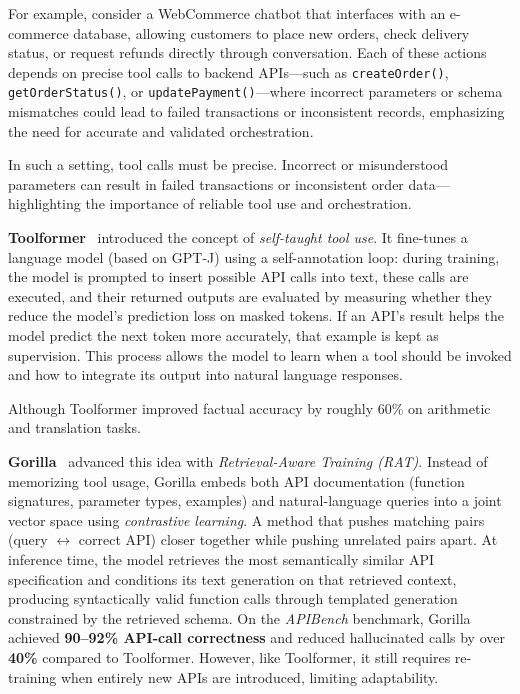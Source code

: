 For example, consider a WebCommerce chatbot that interfaces with an e-commerce database, allowing customers to place new orders, check delivery status, or request refunds directly through conversation.
Each of these actions depends on precise tool calls to backend APIs—such as \texttt{createOrder()}, \texttt{getOrderStatus()}, or \texttt{updatePayment()}—where incorrect parameters or schema mismatches could lead to failed transactions or inconsistent records, emphasizing the need for accurate and validated orchestration. 

In such a setting, tool calls must be precise. Incorrect or misunderstood parameters can result in failed transactions or inconsistent order data—highlighting the importance of reliable tool use and orchestration.

\textbf{Toolformer}~\cite{schick2023toolformer} introduced the concept of \emph{self-taught tool use}.  
It fine-tunes a language model (based on GPT-J) using a self-annotation loop: during training, the model is prompted to insert possible API calls into text, these calls are executed, and their returned outputs are evaluated by measuring whether they reduce the model’s prediction loss on masked tokens.  
If an API’s result helps the model predict the next token more accurately, that example is kept as supervision.  
This process allows the model to learn when a tool should be invoked and how to integrate its output into natural language responses.  

Although Toolformer improved factual accuracy by roughly 60\% on arithmetic and translation tasks.

\textbf{Gorilla}~\cite{patil2023gorilla} advanced this idea with \emph{Retrieval-Aware Training (RAT)}.  
Instead of memorizing tool usage, Gorilla embeds both API documentation (function signatures, parameter types, examples) and natural-language queries into a joint vector space using \emph{contrastive learning}. A method that pushes matching pairs (query $\leftrightarrow$ correct API) closer together while pushing unrelated pairs apart.  
At inference time, the model retrieves the most semantically similar API specification and conditions its text generation on that retrieved context, producing syntactically valid function calls through templated generation constrained by the retrieved schema.  
On the \textit{APIBench} benchmark, Gorilla achieved \textbf{90–92\% API-call correctness} and reduced hallucinated calls by over \textbf{40\%} compared to Toolformer.  
However, like Toolformer,  it still requires re-training when entirely new APIs are introduced, limiting adaptability.

